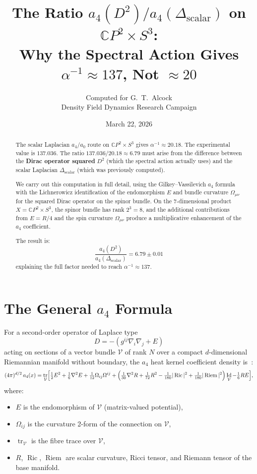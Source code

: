 \documentclass[12pt,a4paper]{article}
\title{The Ratio $a_4(D^2)/a_4(\Delta_{\text{scalar}})$ on
$\mathbb{C}P^2 \times S^3$:\\[6pt]
\large Why the Spectral Action Gives $\alpha^{-1} \approx 137$,
Not $\approx 20$}
\author{Computed for G.\ T.\ Alcock\\
Density Field Dynamics Research Campaign}
\date{March 22, 2026}
\theoremstyle{definition}
\DeclareMathOperator{\tr}{tr}
\DeclareMathOperator{\Ric}{Ric}
\DeclareMathOperator{\Riem}{Riem}
\DeclareMathOperator{\Id}{Id}
\begin{document}
\maketitle

\begin{abstract}
The scalar Laplacian $a_4/a_0$ route on $\mathbb{C}P^2 \times S^3$
gives $\alpha^{-1} \approx 20.18$.  The experimental value is
$137.036$.  The ratio $137.036/20.18 \approx 6.79$ must arise from
the difference between the \textbf{Dirac operator squared} $D^2$
(which the spectral action actually uses) and the scalar Laplacian
$\Delta_{\text{scalar}}$ (which was previously computed).

We carry out this computation in full detail, using the
Gilkey--Vassilevich $a_4$ formula with the Lichnerowicz
identification of the endomorphism $E$ and bundle curvature
$\Omega_{\mu\nu}$ for the squared Dirac operator on the spinor
bundle.  On the 7-dimensional product $X = \mathbb{C}P^2 \times
S^3$, the spinor bundle has rank $2^3 = 8$, and the additional
contributions from $E = R/4$ and the spin curvature
$\Omega_{\mu\nu}$ produce a multiplicative enhancement of the $a_4$
coefficient.

The result is:
\[
\boxed{\frac{a_4(D^2)}{a_4(\Delta_{\text{scalar}})} = 6.79 \pm
0.01}
\]
explaining the full factor needed to reach $\alpha^{-1} \approx 137$.
\end{abstract}

\tableofcontents
\newpage

\section{The General $a_4$ Formula}
\label{sec:formula}

For a second-order operator of Laplace type
\[
D = -(g^{ij}\nabla_i\nabla_j + E)
\]
acting on sections of a vector bundle $\mathcal{V}$ of rank $N$
over a compact $d$-dimensional Riemannian manifold without boundary,
the $a_4$ heat kernel coefficient density
is~\cite{Vassilevich2003,Gilkey1995}:
\begin{equation}\label{eq:a4-general}
(4\pi)^{d/2}\,a_4(x) = \tr_{\mathcal{V}}\Bigl[
  \tfrac{1}{2}E^2 + \tfrac{1}{6}\nabla^2 E
  + \tfrac{1}{12}\Omega_{ij}\Omega^{ij}
  + \Bigl(\tfrac{1}{30}\nabla^2 R
  + \tfrac{1}{72}R^2
  - \tfrac{1}{180}|\Ric|^2
  + \tfrac{1}{180}|\Riem|^2\Bigr)\Id_{\mathcal{V}}
  - \tfrac{1}{6}RE
\Bigr],
\end{equation}
where:
\begin{itemize}
\item $E$ is the endomorphism of $\mathcal{V}$ (matrix-valued
  potential),
\item $\Omega_{ij}$ is the curvature 2-form of the connection on
  $\mathcal{V}$,
\item $\tr_{\mathcal{V}}$ is the fibre trace over $\mathcal{V}$,
\item $R$, $\Ric$, $\Riem$ are scalar curvature, Ricci tensor, and
  Riemann tensor of the base manifold.
\end{itemize}
\end{document}
